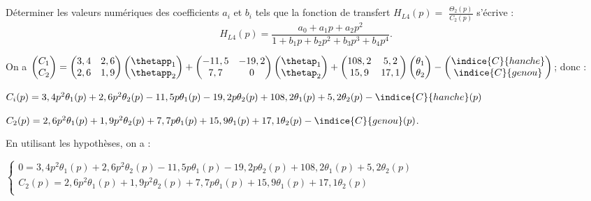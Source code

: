 \documentclass[11pt]{article}
\begin{document}
\UPSTIquestion Déterminer les valeurs numériques des coefficients $a_{i}$ et $b_{i}$ tels que la fonction de transfert $H_{L 4}(p)=$ $\frac{\Theta_{2}(p)}{C_{2}(p)}$ s'écrive :
$$
H_{L 4}(p)=\frac{a_{0}+a_{1} p+a_{2} p^{2}}{1+b_{1} p+b_{2} p^{2}+b_{3} p^{3}+b_{4} p^{4}}.
$$

\begin{UPSTIcorrige}
On a $
\begin{pmatrix}
C_1 \\
C_2
\end{pmatrix}
=\begin{pmatrix}
3,4 & 2,6 \\
2,6 & 1,9
\end{pmatrix} \begin{pmatrix}
\thetapp_1 \\
\thetapp_2
\end{pmatrix}
+
\begin{pmatrix}
-11,5 & -19,2 \\
7,7 & 0
\end{pmatrix} \begin{pmatrix}
\thetap_1 \\
\thetap_2
\end{pmatrix}
+
\begin{pmatrix}
108,2 & 5,2 \\
15,9 & 17,1
\end{pmatrix} 
\begin{pmatrix}
\theta_1 \\
\theta_2
\end{pmatrix}-
\begin{pmatrix}
\indice{C}{hanche} \\
\indice{C}{genou}
\end{pmatrix}
$; donc : 

$C_i(p) = 3,4 p^2 \theta_1(p) + 2,6p^2\theta_2(p) - 11,5 p\theta_1(p) - 19,2p\theta_2(p) + 108,2\theta_1(p) + 5,2\theta_2(p) - \indice{C}{hanche}(p)$

$C_2(p) = 2,6 p^2 \theta_1(p) + 1,9 p^2\theta_2(p) + 7,7 p\theta_1(p) + 15,9\theta_1(p) + 17,1\theta_2(p) - \indice{C}{genou}(p)$.

En utilisant les hypothèses, on a :

$\left\{
\begin{array}{l} 
0= 3,4 p^2 \theta_1(p) + 2,6p^2\theta_2(p) - 11,5 p\theta_1(p) - 19,2p\theta_2(p) + 108,2\theta_1(p) + 5,2\theta_2(p) \\
C_2(p) = 2,6 p^2 \theta_1(p) + 1,9 p^2\theta_2(p) + 7,7 p\theta_1(p) + 15,9\theta_1(p) + 17,1\theta_2(p) \\
\end{array}
\right.$


\end{UPSTIcorrige}
\end{document}
